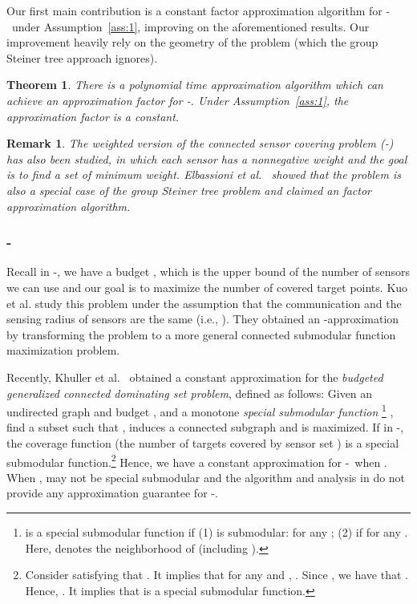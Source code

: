 \documentclass[11pt]{article}
\newcommand{\rednote}[1]{#1}
\newcommand{\mincsc}{-}
\newcommand{\minwcsc}{-}
\newcommand{\bcsc}{-}
\newtheorem{theorem}{Theorem}
\newtheorem{remark}{Remark}
\begin{document}
Our first main contribution is a constant factor approximation algorithm for
\mincsc\ under Assumption~\ref{ass:1}, improving on the aforementioned results.
Our improvement heavily rely on the geometry of the problem (which the group Steiner tree approach ignores).


\begin{theorem}
	There is a polynomial time approximation algorithm which can achieve
	an approximation factor  for \mincsc.
	Under Assumption~\ref{ass:1}, the approximation factor is a constant.
\end{theorem}

\begin{remark}
	The weighted version of the connected sensor covering problem (\minwcsc) has also been studied, in which each sensor has a nonnegative weight and the goal is to find a set of minimum weight. 
Elbassioni et al.~\cite{elbassioni2012relation} showed that the problem is also a special case of the group Steiner tree problem and claimed an  factor approximation algorithm.
\end{remark}

\vspace{-0.3cm}
\subsubsection{\bcsc}
Recall in \bcsc, we have a budget , which is the upper bound of the number of sensors we can use and our goal is to maximize the number of covered target points.
Kuo et al.\cite{kuo2013maximizing} study this problem
under the assumption that the communication and the sensing radius of sensors are the same
(i.e., ). They obtained an -approximation by transforming the problem to a more general connected submodular function maximization problem.

Recently, Khuller et al.~\cite{khuller2014analyzing} obtained
a constant approximation for the {\em budgeted generalized connected dominating set problem},
defined as follows: Given an undirected graph  and budget , and a  monotone {\em special submodular function}
\footnote{
	 is a special submodular function if (1)  is submodular:
	 for any ;
	(2)  if 
	for any . Here,  denotes the neighborhood of  (including ).
} , find a subset  such that ,
 induces a connected subgraph
and  is maximized.
If  in \bcsc, the coverage function  (the number of targets covered by sensor set ) is a special submodular function.\footnote{\rednote{Consider  satisfying that . It implies that for any  and , . Since , we have that . Hence, . It implies that  is a special submodular function.}} 
Hence, we have a constant approximation
for \bcsc\ when .
When ,  may not be special submodular and the algorithm and analysis
in \cite{khuller2014analyzing} do not provide any approximation guarantee for \bcsc.
\end{document}

